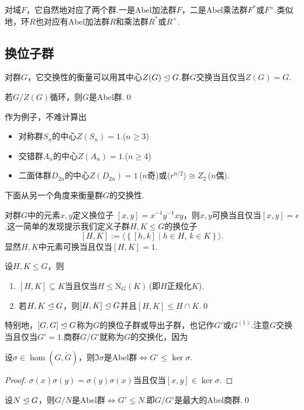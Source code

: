 对域$F$，它自然地对应了两个群.一是Abel加法群$F$，二是Abel乘法群$F^*$或$F^\times$.类似地，环$R$也对应有Abel加法群$R$和乘法群$R^*$或$R^\times$.
\subsection{换位子群}
对群$G$，它交换性的衡量可以用其中心$Z(G)\trianglelefteq G$.群$G$交换当且仅当$Z(G)=G$.
\begin{prop}
	若$G/Z(G)$循环，则$G$是Abel群.\qed
\end{prop}

作为例子，不难计算出
\begin{itemize}
	\item 对称群$S_n$的中心$Z(S_n)=1$.($n\ge 3$)
	\item 交错群$A_n$的中心$Z(A_n)=1$.($n\ge 4$)
	\item 二面体群$D_{2n}$的中心$Z(D_{2n})=1$\,($n$奇)或$\langle r^{n/2}\rangle \cong Z_2$\,($n$偶).
\end{itemize}

下面从另一个角度来衡量群$G$的交换性.

对群$G$中的元素$x,y$定义{\heiti 换位子} $[x,y]=x^{-1}y^{-1}xy$，则$x,y$可换当且仅当$[x,y]=e$.这一简单的发现提示我们定义子群$H,K\le G$的{\heiti 换位子}
\[
	[H,K]:=\langle \left\{[h,k]\mid h\in H,\,k\in K\right\}\rangle .
\]
显然$H,K$中元素可换当且仅当$[H,K]=1$.
\begin{lemma}
	设$H,K\le G$，则
	\begin{enumerate}
		\item $[H,K]\subseteq K$当且仅当$H\le\mathrm{N}_G(K)$\,(即$H$正规化$K$).
		\item 若$H,K\trianglelefteq G$，则$[H,K]\trianglelefteq G$并且$[H,K]\le H\cap K$.\qed
	\end{enumerate}
\end{lemma}

特别地，$[G,G]\trianglelefteq G$称为$G$的{\heiti 换位子群}或{\heiti 导出子群}，也记作$G'$或$G^{(1)}$.注意$G$交换当且仅当$G'=1$.商群$G/G'$就称为$G$的{\heiti 交换化}，因为\hypertarget{text:Abelianization}{}
\begin{prop}
	设$\sigma\in\hom(G,\tilde{G})$，则$\Im\sigma$是Abel群$\iff G'\le\ker\sigma$.
\end{prop}
\begin{proof}
	$\sigma(x)\sigma(y)=\sigma(y)\sigma(x)$当且仅当$[x,y]\in\ker\sigma$.
\end{proof}
\begin{cor*}
	设$N\trianglelefteq G$，则$G/N$是Abel群$\iff G'\le N$.即$G/G'$是最大的Abel商群.\qed
\end{cor*}

